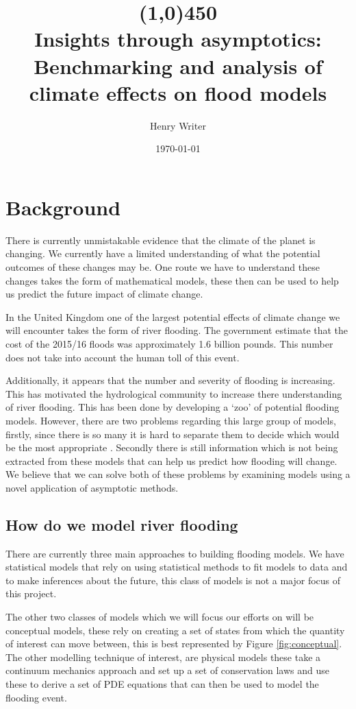 \documentclass[11pt]{article}
\title{\line(1,0){450} \\ \Huge\textbf{Insights through asymptotics:}\\
 \LARGE Benchmarking and analysis of climate effects on flood models}
\author{Henry Writer }
\date{\monthyeardate\today}
\begin{document}
\maketitle

\section{Background}

There is currently unmistakable evidence that the climate of the planet is changing. We currently have a limited understanding of what the potential outcomes of these changes may be. One route we have to understand these changes takes the form of mathematical models, these then can be used to help us predict the future impact of climate change.

In the United Kingdom one of the largest potential effects of climate change we will encounter takes the form of river flooding. The government estimate that the cost of the 2015/16 floods was approximately 1.6 billion pounds. This number does not take into account the human toll of this event. 


Additionally, it appears that the number and severity of flooding is increasing. This has motivated the hydrological community to increase there understanding of river flooding. This has been done by developing a `zoo' of potential flooding models. However, there are two problems regarding this large group of models, firstly, since there is so many it is hard to separate them to decide which would be the most appropriate \cite{neelz2013benchmarking}. 
Secondly there is still information which is not being extracted from these models that can help us predict how flooding will change. We believe that we can solve both of these problems by examining models using a novel application of asymptotic methods.


\subsection{How do we model river flooding}
There are currently three main approaches to building flooding models. We have statistical models that rely on using statistical methods to fit models to data and to make inferences about the future, this class of models is not a major focus of this project. 

The other two classes of models which we will focus our efforts on will be conceptual models, these rely on creating a set of states from which the quantity of interest can move between, this is best represented by Figure \ref{fig:conceptual}. 
The other modelling technique of interest, are physical models these take a continuum mechanics approach and set up a set of conservation laws and use these to derive a set of PDE equations that can then be used to model the flooding event.
\end{document}
